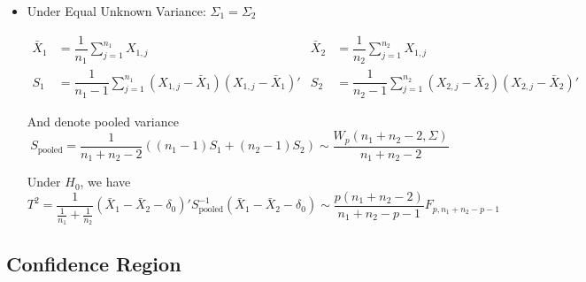 \begin{itemize}[topsep=2pt,itemsep=2pt]
\begin{itemize}[topsep=2pt,itemsep=2pt]
        \item Under Equal Unknown Variance: $ \Sigma_1=\Sigma_2 $
        
        \begin{align}
            \bar{X}_1&=\dfrac{1}{n_1}\sum_{j=1}^{n_1} X_{1,j}&\bar{X}_2&=\dfrac{1}{n_2}\sum_{j=1}^{n_2} X_{1,j}\\
            S_1&=\dfrac{1}{n_1-1}\sum_{j=1}^{n_1}(X_{1,j}-\bar{X}_1)(X_{1,j}-\bar{X}_1)'&S_2&=\dfrac{1}{n_2-1}\sum_{j=1}^{n_2}(X_{2,j}-\bar{X}_2)(X_{2,j}-\bar{X}_2)'
        \end{align}
        
        And denote pooled variance
        \begin{equation}\label{EqaPooledVariance}
            S_\mathrm{pooled}=\dfrac{1}{n_1+n_2-2}\left((n_1-1)S_1+(n_2-1)S_2 \right)  \sim \dfrac{W_p(n_1+n_2-2,\Sigma )}{n_1+n_2-2}
        \end{equation}
        
        
        Under $ H_0 $, we have 
        \begin{equation}
            T^2= \dfrac{1}{\frac{1}{n_1}+\frac{1}{n_2}}(\bar{X}_1-\bar{X}_2-\delta _0)'S_\mathrm{pooled}^{-1}(\bar{X}_1-\bar{X}_2-\delta _0)\sim \dfrac{p(n_1+n_2-2)}{n_1+n_2-p-1}F_{p,n_1+n_2-p-1}
        \end{equation}
        

    \end{itemize}
    
    


\end{itemize}




    


\subsection{Confidence Region}

